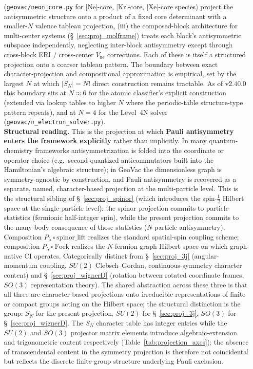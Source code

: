 \documentclass[11pt]{article}
\begin{document}
(\texttt{geovac/neon\_core.py} for [Ne]-core, [Kr]-core, [Xe]-core
species) project the antisymmetric structure onto a product of a
fixed core determinant with a smaller-$N$ valence tableau projection,
(iii) the composed-block architecture for multi-center systems
(\S~\ref{sec:proj_molframe}) treats each block's antisymmetric
subspace independently, neglecting inter-block antisymmetry except
through cross-block ERI / cross-center $V_\text{ne}$ corrections.
Each of these is itself a structured projection onto a coarser
tableau pattern.  The boundary between exact character-projection
and compositional approximation is empirical, set by the largest $N$
at which $|S_N| = N!$ direct construction remains tractable.  As of
v2.40.0 this boundary sits at $N \approx 6$ for the atomic
classifier's explicit construction (extended via lookup tables to
higher $N$ where the periodic-table structure-type pattern repeats),
and at $N = 4$ for the Level~4N solver
(\texttt{geovac/n\_electron\_solver.py}).\\
\textbf{Structural reading.}  This is the projection at which
\textbf{Pauli antisymmetry enters the framework explicitly} rather
than implicitly.  In many quantum-chemistry frameworks
antisymmetrization is folded into the coordinate or operator choice
(e.g.\ second-quantized anticommutators built into the Hamiltonian's
algebraic structure); in GeoVac the dimensionless graph is
symmetry-agnostic by construction, and
Pauli antisymmetry is recovered as a separate, named, character-based
projection at the multi-particle level.  This is the structural
sibling of \S~\ref{sec:proj_spinor} (which introduces the
spin-$\tfrac{1}{2}$ Hilbert space at the single-particle level): the
spinor projection commits to particle statistics (fermionic
half-integer spin), while the present projection commits to the
many-body consequence of those statistics ($N$-particle
antisymmetry).  Composition $P_\lambda \circ
\text{spinor\_lift}$ realizes the standard spatial-spin coupling
scheme; composition $P_\lambda \circ \text{Fock}$ realizes the
$N$-fermion graph Hilbert space on which graph-native CI operates.
Categorically distinct from \S~\ref{sec:proj_3j} (angular-momentum
coupling, $SU(2)$ Clebsch--Gordan, continuous-symmetry character
content) and \S~\ref{sec:proj_wignerD} (rotation between rotated
coordinate frames, $SO(3)$ representation theory).  The shared
abstraction across these three is that all three are character-based
projections onto irreducible representations of finite or compact
groups acting on the Hilbert space; the structural distinction is
the group: $S_N$ for the present projection, $SU(2)$ for
\S~\ref{sec:proj_3j}, $SO(3)$ for \S~\ref{sec:proj_wignerD}.  The
$S_N$ character table has integer entries while the $SU(2)$ and
$SO(3)$ projector matrix elements introduce algebraic-extension and
trigonometric content respectively
(Table~\ref{tab:projection_axes}); the absence of transcendental
content in the symmetry projection is therefore not coincidental
but reflects the discrete finite-group structure underlying Pauli
exclusion.
\end{document}

